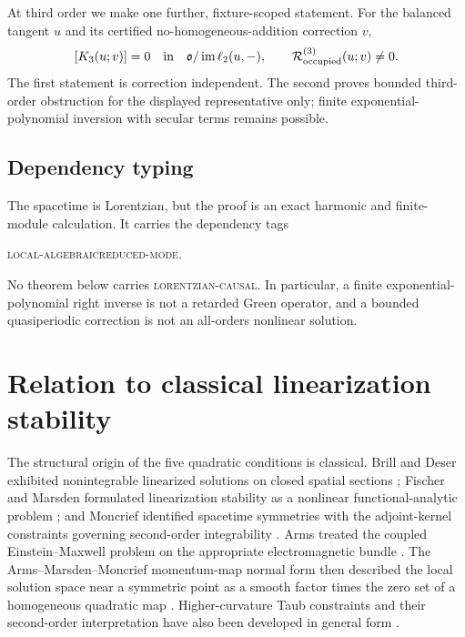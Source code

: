 \documentclass[11pt]{article}
\theoremstyle{definition}
\theoremstyle{remark}
\newcommand{\cR}{\mathcal R}
\begin{document}
At third order we make one further, fixture-scoped statement.  For the
balanced tangent \(u\) and its certified no-homogeneous-addition correction
\(v\),
\begin{equation}\label{eq:third-order-summary}
 [K_3(u;v)]=0\quad\hbox{in}\quad
 \mathfrak o/\operatorname{im}\ell_2(u,-),
 \qquad
 \cR^{(3)}_{\rm occupied}(u;v)\ne0.
\end{equation}
The first statement is correction independent.  The second proves bounded
third-order obstruction for the displayed representative only; finite
exponential-polynomial inversion with secular terms remains possible.

\subsection{Dependency typing}

The spacetime is Lorentzian, but the proof is an exact harmonic and
finite-module calculation.  It carries the dependency tags
\begin{center}
\textsc{local-algebraic}\qquad\textsc{reduced-mode}.
\end{center}
No theorem below carries \textsc{lorentzian-causal}.  In particular, a
finite exponential-polynomial right inverse is not a retarded Green operator,
and a bounded quasiperiodic correction is not an all-orders nonlinear
solution.

\section{Relation to classical linearization stability}

The structural origin of the five quadratic conditions is classical.
Brill and Deser exhibited nonintegrable linearized solutions on closed
spatial sections \cite{BrillDeser}; Fischer and Marsden formulated
linearization stability as a nonlinear functional-analytic problem
\cite{FischerMarsden}; and Moncrief identified spacetime symmetries with the
adjoint-kernel constraints governing second-order integrability
\cite{MoncriefI,MoncriefII}.  Arms treated the coupled Einstein--Maxwell
problem on the appropriate electromagnetic bundle \cite{ArmsEM}.  The
Arms--Marsden--Moncrief momentum-map normal form then described the local
solution space near a symmetric point as a smooth factor times the zero set
of a homogeneous quadratic map \cite{AMMBifurcation,ArmsMarsdenMoncrief}.
Higher-curvature Taub constraints and their second-order interpretation have
also been developed in general form \cite{AltasTekin,AltasTekinTaub}.
\end{document}
